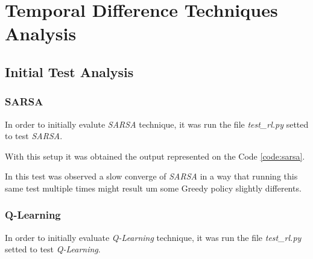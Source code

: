 \documentclass[journal]{IEEEtran}
\begin{document}






\section{Temporal Difference Techniques Analysis}

\subsection{Initial Test Analysis}

\subsubsection{SARSA}

In order to initially evalute \textit{SARSA} technique, it was run the file \textit{test\_rl.py} setted to test \textit{SARSA}.

With this setup it was obtained the output represented on the Code \ref{code:sarsa}.



In this test was observed a slow converge of \textit{SARSA} in a way that running this same test multiple times might result um some Greedy policy slightly differents.

\subsubsection{Q-Learning}

In order to initially evaluate \textit{Q-Learning} technique, it was run the file \textit{test\_rl.py} setted to test \textit{Q-Learning}.
\end{document}
